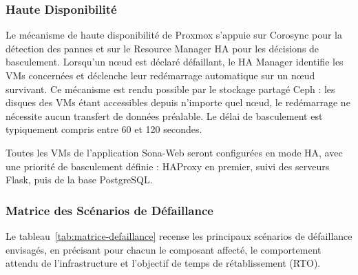 \subsubsection{Haute Disponibilité}

\par Le mécanisme de haute disponibilité de Proxmox s'appuie sur Corosync pour la détection des pannes et sur le Resource Manager HA pour les décisions de basculement. Lorsqu'un nœud est déclaré défaillant, le HA Manager identifie les VMs concernées et déclenche leur redémarrage automatique sur un nœud survivant. Ce mécanisme est rendu possible par le stockage partagé Ceph : les disques des VMs étant accessibles depuis n'importe quel nœud, le redémarrage ne nécessite aucun transfert de données préalable. Le délai de basculement est typiquement compris entre 60 et 120 secondes.\\

\par Toutes les VMs de l'application Sona-Web seront configurées en mode HA, avec une priorité de basculement définie : HAProxy en premier, suivi des serveurs Flask, puis de la base PostgreSQL.\\

\subsubsection{Matrice des Scénarios de Défaillance}

\par Le tableau~\ref{tab:matrice-defaillance} recense les principaux scénarios de défaillance envisagés, en précisant pour chacun le composant affecté, le comportement attendu de l'infrastructure et l'objectif de temps de rétablissement (RTO).\\

